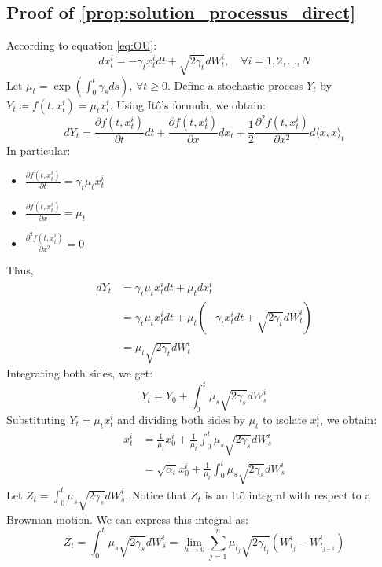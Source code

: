 \documentclass[a4paper,10pt]{article}
\theoremstyle{definition} %
\theoremstyle{definition} %
\theoremstyle{definition} %
\theoremstyle{definition} %
\newcommand{\0}{\boldsymbol{0}}
\begin{document}
\subsection{Proof of \cref{prop:solution_processus_direct}} \label{sec:proof_solution_processus_direct}
According to equation \cref{eq:OU}:
\begin{equation*}
dx_t^i = -\gamma_t x_t^i dt + \sqrt{2\gamma_t} dW_t^i, \quad \forall i=1,2,\dots,N
\end{equation*}
Let $\mu_t = \exp\left(\int_0^t \gamma_s ds\right)$, $\forall t \geq 0$.
Define a stochastic process $Y_t$ by $Y_t \coloneqq f(t, x_t^i) = \mu_t x_t^i$.
Using Itô's formula, we obtain:
\begin{equation*}
dY_t = \frac{\partial f(t, x_t^i)}{\partial t} dt + \frac{\partial f(t, x_t^i)}{\partial x} dx_t + \frac{1}{2} \frac{\partial^2 f(t, x_t^i)}{\partial x^2} d\langle x, x \rangle_t
\end{equation*}
In particular:
\begin{itemize}
    \item[] $\frac{\partial f(t, x_t^i)}{\partial t} = \gamma_t \mu_t x_t^i$
    \item[] $\frac{\partial f(t, x_t^i)}{\partial x} = \mu_t$
    \item[] $\frac{\partial^2 f(t, x_t^i)}{\partial x^2} = 0$
\end{itemize}
Thus,
\begin{align*}
dY_t &= \gamma_t \mu_t x_t^i dt + \mu_t dx_t^i \\
&= \gamma_t \mu_t x_t^i dt + \mu_t \left(-\gamma_t x_t^i dt + \sqrt{2\gamma_t} dW_t^i\right) \\
&= \mu_t \sqrt{2\gamma_t} dW_t^i
\end{align*}
Integrating both sides, we get:
\begin{equation*}
Y_t = Y_0 + \int_0^t \mu_s \sqrt{2\gamma_s} dW_s^i
\end{equation*}
Substituting $Y_t = \mu_t x_t^i$ and dividing both sides by $\mu_t$ to isolate $x_t^i$, we obtain:
\begin{align*}
x_t^i &= \frac{1}{\mu_t} x_0^i + \frac{1}{\mu_t} \int_0^t \mu_s \sqrt{2\gamma_s} dW_s^i \\
&= \sqrt{\bar{\alpha}_t} x_0^i + \frac{1}{\mu_t} \int_0^t \mu_s \sqrt{2\gamma_s} dW_s^i
\end{align*}
Let $Z_t = \int_0^t \mu_s \sqrt{2\gamma_s} dW_s^i$. Notice that $Z_t$ is an Itô integral with respect to a Brownian motion. We can express this integral as:
\begin{equation*}
Z_t = \int_0^t \mu_s \sqrt{2\gamma_s} dW_s^i = \lim_{h \to 0} \sum_{j=1}^n \mu_{t_j} \sqrt{2\gamma_{t_j}} (W_{t_j}^i - W_{t_{j-1}}^i)
\end{equation*}
\end{document}
